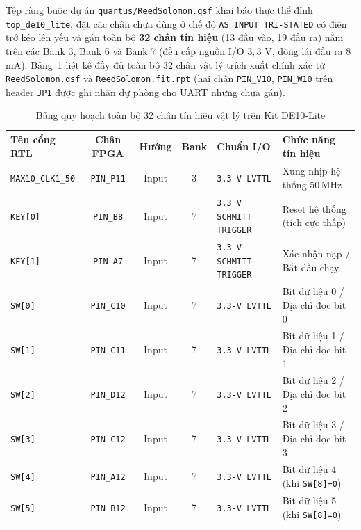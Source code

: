 Tệp ràng buộc dự án \texttt{quartus/ReedSolomon.qsf} khai báo thực thể đỉnh \texttt{top\_de10\_lite}, đặt các chân chưa dùng ở chế độ \texttt{AS INPUT TRI-STATED} có điện trở kéo lên yếu và gán toàn bộ \textbf{32 chân tín hiệu} (13 đầu vào, 19 đầu ra) nằm trên các Bank 3, Bank 6 và Bank 7 (đều cấp nguồn I/O $3{,}3\text{ V}$, dòng lái đầu ra 8\,mA). Bảng~\ref{tab:pin-assign} liệt kê đầy đủ toàn bộ 32 chân vật lý trích xuất chính xác từ \texttt{ReedSolomon.qsf} và \texttt{ReedSolomon.fit.rpt} (hai chân \texttt{PIN\_V10}, \texttt{PIN\_W10} trên header \texttt{JP1} được ghi nhận dự phòng cho UART nhưng chưa gán).

\begin{table}[!htb]
    \centering
    \caption{Bảng quy hoạch toàn bộ 32 chân tín hiệu vật lý trên Kit DE10-Lite}
    \label{tab:pin-assign}
    \scriptsize
    \setlength{\tabcolsep}{4pt}
    \renewcommand{\arraystretch}{1.01}
    \begin{tabular}{l c c c l p{4.6cm}}
        \toprule
        \textbf{Tên cổng RTL} & \textbf{Chân FPGA} & \textbf{Hướng} & \textbf{Bank} & \textbf{Chuẩn I/O} & \textbf{Chức năng tín hiệu} \\
        \midrule
        \texttt{MAX10\_CLK1\_50} & \texttt{PIN\_P11} & Input & 3 & \texttt{3.3-V LVTTL} & Xung nhịp hệ thống 50\,MHz \\
        \texttt{KEY[0]} & \texttt{PIN\_B8} & Input & 7 & \texttt{3.3 V SCHMITT TRIGGER} & Reset hệ thống (tích cực thấp) \\
        \texttt{KEY[1]} & \texttt{PIN\_A7} & Input & 7 & \texttt{3.3 V SCHMITT TRIGGER} & Xác nhận nạp / Bắt đầu chạy \\
        \texttt{SW[0]} & \texttt{PIN\_C10} & Input & 7 & \texttt{3.3-V LVTTL} & Bit dữ liệu 0 / Địa chỉ đọc bit 0 \\
        \texttt{SW[1]} & \texttt{PIN\_C11} & Input & 7 & \texttt{3.3-V LVTTL} & Bit dữ liệu 1 / Địa chỉ đọc bit 1 \\
        \texttt{SW[2]} & \texttt{PIN\_D12} & Input & 7 & \texttt{3.3-V LVTTL} & Bit dữ liệu 2 / Địa chỉ đọc bit 2 \\
        \texttt{SW[3]} & \texttt{PIN\_C12} & Input & 7 & \texttt{3.3-V LVTTL} & Bit dữ liệu 3 / Địa chỉ đọc bit 3 \\
        \texttt{SW[4]} & \texttt{PIN\_A12} & Input & 7 & \texttt{3.3-V LVTTL} & Bit dữ liệu 4 (khi \texttt{SW[8]=0}) \\
        \texttt{SW[5]} & \texttt{PIN\_B12} & Input & 7 & \texttt{3.3-V LVTTL} & Bit dữ liệu 5 (khi \texttt{SW[8]=0}) \\

\end{tabular}
\end{table}
